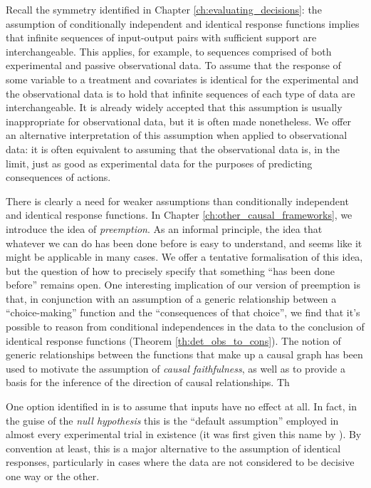 Recall the symmetry identified in Chapter \ref{ch:evaluating_decisions}: the assumption of conditionally independent and identical response functions implies that infinite sequences of input-output pairs with sufficient support are interchangeable. This applies, for example, to sequences comprised of both experimental and passive observational data. To assume that the response of some variable to a treatment and covariates is identical for the experimental and the observational data is to hold that infinite sequences of each type of data are interchangeable. It is already widely accepted that this assumption is usually inappropriate for observational data, but it is often made nonetheless. We offer an alternative interpretation of this assumption when applied to observational data: it is often equivalent to assuming that the observational data is, in the limit, just as good as experimental data for the purposes of predicting consequences of actions.

There is clearly a need for weaker assumptions than conditionally independent and identical response functions. In Chapter \ref{ch:other_causal_frameworks}, we introduce the idea of \emph{preemption}. As an informal principle, the idea that whatever we can do has been done before is easy to understand, and seems like it might be applicable in many cases. We offer a tentative formalisation of this idea, but the question of how to precisely specify that something ``has been done before'' remains open. One interesting implication of our version of preemption is that, in conjunction with an assumption of a generic relationship between a ``choice-making'' function and the ``consequences of that choice'', we find that it's possible to reason from conditional independences in the data to the conclusion of identical response functions (Theorem \ref{th:det_obs_to_cons}). The notion of generic relationships between the functions that make up a causal graph has been used to motivate the assumption of \emph{causal faithfulness}, as well as to provide a basis for the inference of the direction of causal relationships. Th

One option identified in \citet{duvenaud_causal_2008} is to assume that inputs have no effect at all. In fact, in the guise of the \emph{null hypothesis} this is the ``default assumption'' employed in almost every experimental trial in existence (it was first given this name by \citet{fisher_design_1971}). By convention at least, this is a major alternative to the assumption of identical responses, particularly in cases where the data are not considered to be decisive one way or the other. 


